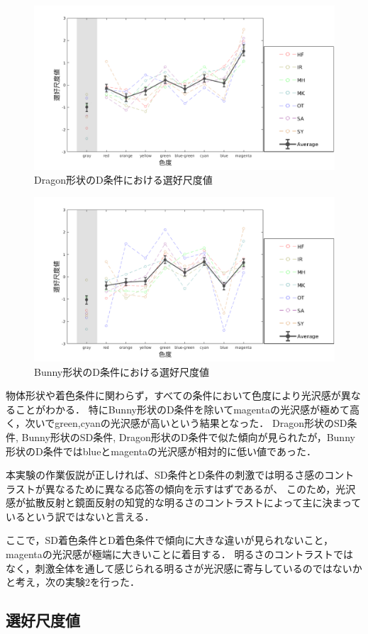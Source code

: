         \newpage
        \begin{figure}[h]
            \centering
            \includegraphics[width=15.0cm]{./img/ex1_res_DD_p.png}
            \caption{Dragon形状のD条件における選好尺度値}
            \label{ex1_DD}
        \end{figure}

        \begin{figure}[h]
            \centering
            \includegraphics[width=15.0cm]{./img/ex1_res_BD_p.png}
            \caption{Bunny形状のD条件における選好尺度値}
            \label{ex1_BD}
        \end{figure}

        物体形状や着色条件に関わらず，すべての条件において色度により光沢感が異なることがわかる．
        特にBunny形状のD条件を除いてmagentaの光沢感が極めて高く，次いでgreen,cyanの光沢感が高いという結果となった．
        Dragon形状のSD条件, Bunny形状のSD条件, Dragon形状のD条件で似た傾向が見られたが，Bunny形状のD条件ではblueとmagentaの光沢感が相対的に低い値であった．

        本実験の作業仮説が正しければ、SD条件とD条件の刺激では明るさ感のコントラストが異なるために異なる応答の傾向を示すはずであるが、
        このため，光沢感が拡散反射と鏡面反射の知覚的な明るさのコントラストによって主に決まっているという訳ではないと言える．

        ここで，SD着色条件とD着色条件で傾向に大きな違いが見られないこと，magentaの光沢感が極端に大きいことに着目する．
        明るさのコントラストではなく，刺激全体を通して感じられる明るさが光沢感に寄与しているのではないかと考え，次の実験2を行った．

    \subsection{選好尺度値}